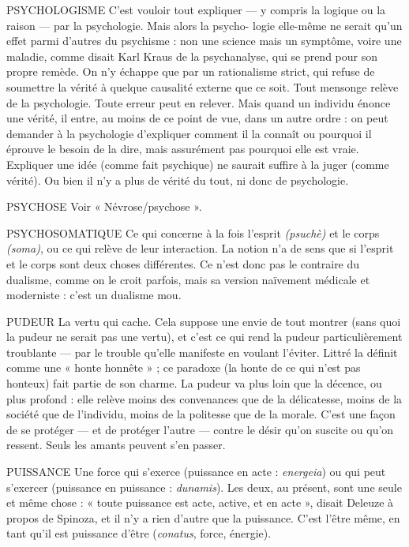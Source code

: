 PSYCHOLOGISME C'est vouloir tout expliquer — y compris la logique ou
la raison — par la psychologie. Mais alors la psycho-
logie elle-même ne serait qu’un effet parmi d’autres du psychisme : non une
science mais un symptôme, voire une maladie, comme disait Karl Kraus de la
psychanalyse, qui se prend pour son propre remède. On n’y échappe que par
un rationalisme strict, qui refuse de soumettre la vérité à quelque causalité
externe que ce soit. Tout mensonge relève de la psychologie. Toute erreur peut
en relever. Mais quand un individu énonce une vérité, il entre, au moins de ce
point de vue, dans un autre ordre : on peut demander à la psychologie d’expliquer
comment il la connaît ou pourquoi il éprouve le besoin de la dire, mais
assurément pas pourquoi elle est vraie. Expliquer une idée (comme fait psychique)
ne saurait suffire à la juger (comme vérité). Ou bien il n’y a plus de
vérité du tout, ni donc de psychologie.

PSYCHOSE Voir « Névrose/psychose ».

PSYCHOSOMATIQUE Ce qui concerne à la fois l'esprit {\it (psuchè)} et le
corps {\it (soma)}, ou ce qui relève de leur interaction.
La notion n’a de sens que si l'esprit et le corps sont deux choses différentes. Ce
n’est donc pas le contraire du dualisme, comme on le croit parfois, mais sa version
naïvement médicale et moderniste : c’est un dualisme mou.

PUDEUR La vertu qui cache. Cela suppose une envie de tout montrer (sans
quoi la pudeur ne serait pas une vertu), et c’est ce qui rend la
pudeur particulièrement troublante — par le trouble qu’elle manifeste en voulant
l’éviter. Littré la définit comme une « honte honnête » ; ce paradoxe (la
honte de ce qui n’est pas honteux) fait partie de son charme. La pudeur va plus
loin que la décence, ou plus profond : elle relève moins des convenances que de
la délicatesse, moins de la société que de l’individu, moins de la politesse que
de la morale. C’est une façon de se protéger — et de protéger l’autre — contre le
désir qu’on suscite ou qu’on ressent. Seuls les amants peuvent s’en passer.

PUISSANCE Une force qui s’exerce (puissance en acte : {\it energeia}) ou qui
peut s'exercer (puissance en puissance : {\it dunamis}). Les deux, au
présent, sont une seule et même chose : « toute puissance est acte, active, et en
acte », disait Deleuze à propos de Spinoza, et il n’y a rien d’autre que la puissance.
C’est l’être même, en tant qu’il est puissance d’être ({\it conatus}, force,
énergie).

